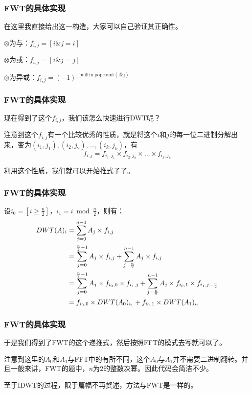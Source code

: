 \documentclass[10pt]{beamer}
\begin{document}
\begin{spacing}{1.2}
\begin{frame}
		\end{frame}
		\begin{frame}
			\frametitle{FWT的具体实现}

			在这里我直接给出这一构造，大家可以自己验证其正确性。 \pause

			$\otimes$为与：$f_{i,j}=[i \& j = i]$

			$\otimes$为或：$f_{i,j}=[i \& j = j]$

			$\otimes$为异或：$f_{i,j}=(-1)^{\mathrm{\_\_builtin\_popcount(i \& j)}}$

		\end{frame}
		\begin{frame}
			\frametitle{FWT的具体实现}

			现在得到了这个$f_{i,j}$，我们该怎么快速进行DWT呢？ \pause

			注意到这个$f_{i,j}$有一个比较优秀的性质，就是将这个$i$和$j$的每一位二进制分解出来，变为$(i_1,j_1),(i_2,j_2), \dots ,(i_k,j_k)$，有
			$$f_{i,j}=f_{i_1,j_1} \times f_{i_2,j_2} \times \dots \times f_{i_k,j_k}$$ \pause

			利用这个性质，我们就可以开始推式子了。

		\end{frame}
		\begin{frame}
			\frametitle{FWT的具体实现}
			设$i_0=[i \geq \frac{n}{2}]$，$i_1 = i \bmod \frac{n}{2}$，则有： \pause
			\begin{align}
				DWT(A)_i &= \sum_{j=0}^{n-1} A_j \times f_{i,j} \notag \\
				&= \sum_{j=0}^{\frac{n}{2}-1} A_j \times f_{i,j} + \sum_{j=\frac{n}{2}}^{n-1} A_j \times f_{i,j} \notag \\
				&= \sum_{j=0}^{\frac{n}{2}-1} A_j \times f_{i_0,0} \times f_{i_1,j} + \sum_{j=\frac{n}{2}}^{n-1} A_j \times f_{i_0,1} \times f_{i_1,j - \frac{n}{2}} \notag \\
				&= f_{i_0,0} \times DWT(A_0)_{i_1} + f_{i_0,1} \times DWT(A_1)_{i_1} \notag
			\end{align}

		\end{frame}
		\begin{frame}
			\frametitle{FWT的具体实现}

			于是我们得到了FWT的这个递推式，然后按照FFT的模式去写就可以了。 \pause

			注意到这里的$A_0$和$A_1$与FFT中的有所不同，这个$A_0$与$A_1$并不需要二进制翻转。并且一般来讲，FWT的题中，$n$为$2$的整数次幂。因此代码会简洁不少。 \pause

			至于IDWT的过程，限于篇幅不再赘述，方法与FWT是一样的。 \pause


\end{frame}
\end{spacing}
\end{document}
